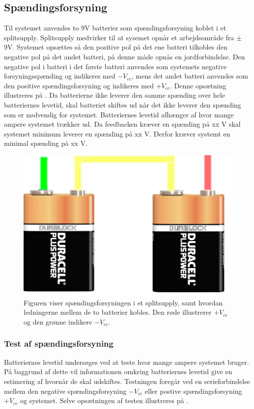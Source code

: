 \subsection{Spændingsforsyning}
Til systemet anvendes to 9V batterier som spændingsforsyning koblet i et splitsupply. Splitsupply medvirker til at sysemet opnår et arbejdsområde fra $\pm$ 9V. Systemet opsættes så den positive pol på det ene batteri tilkobles den negative pol på det andet batteri, på denne måde opnås en jordforbindelse. Den negative pol i batteri i det første batteri anvendes som systemets negative forsyningsspænding og indikeres med $-V_{cc}$, mens det andet batteri anvendes som den positive spændingsforsyning og indikeres med $+V_{cc}$. Denne opsætning illustreres på . 
Da batterierne ikke leverer den samme spænding over hele batteriernes levetid, skal batteriet skiftes ud når det ikke leverer den spænding som er nødvendig for systemet. Batteriernes levetid afhænger af hvor mange ampere systemet trækker ud. Da feedbacken kræver en spænding på xx V skal systemet minimum leverer en spænding på xx V. Derfor kræver systemt en minimal spænding på xx V.

\begin{figure}[H]
\centering
\includegraphics[scale=0.5]{figures/cProblemloesning/batteri.PNG}
\caption{Figuren viser spændingsforsyningen i et splitsupply, samt hvordan ledningerne mellem de to batterier kobles. Den røde illustrerer $+V_{cc}$ og den grønne indikere $-V_{cc}$.}
\label{fig:batteri}
\end{figure}

\subsubsection{Test af spændingsforsyning}
Batteriernes levetid undersøges ved at teste hvor mange ampere systemet bruger. På baggrund af dette vil informationen omkring batteriernes levetid give en estimering af hvornår de skal udskiftes. Testningen foregår ved en serieforbindelse mellem den negative spændingsforsyning $-V_{cc}$ eller postive spændingsforsyning $+V_{cc}$ og systemet. Selve opsætningen af testen illustreres på .

